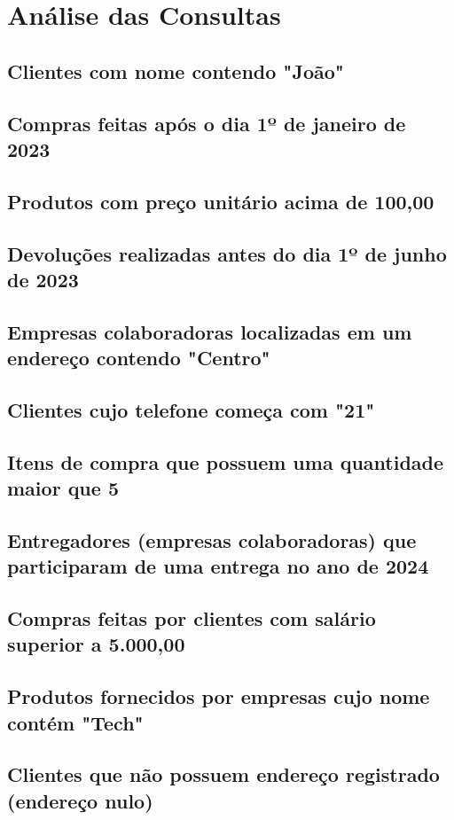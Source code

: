 \documentclass[12pt,a4paper]{article}
\begin{document}
\newpage
\section{Análise das Consultas}

\subsection{Clientes com nome contendo "João"}

\subsection{Compras feitas após o dia 1º de janeiro de 2023}
\subsection{Produtos com preço unitário acima de 100,00}
\subsection{Devoluções realizadas antes do dia 1º de junho de 2023}
\subsection{Empresas colaboradoras localizadas em um endereço contendo "Centro"}
\subsection{Clientes cujo telefone começa com "21"}
\subsection{Itens de compra que possuem uma quantidade maior que 5}
\subsection{Entregadores (empresas colaboradoras) que participaram de uma entrega no ano de 2024}
\subsection{Compras feitas por clientes com salário superior a 5.000,00}
\subsection{Produtos fornecidos por empresas cujo nome contém "Tech"}
\subsection{Clientes que não possuem endereço registrado (endereço nulo)}
\end{document}
